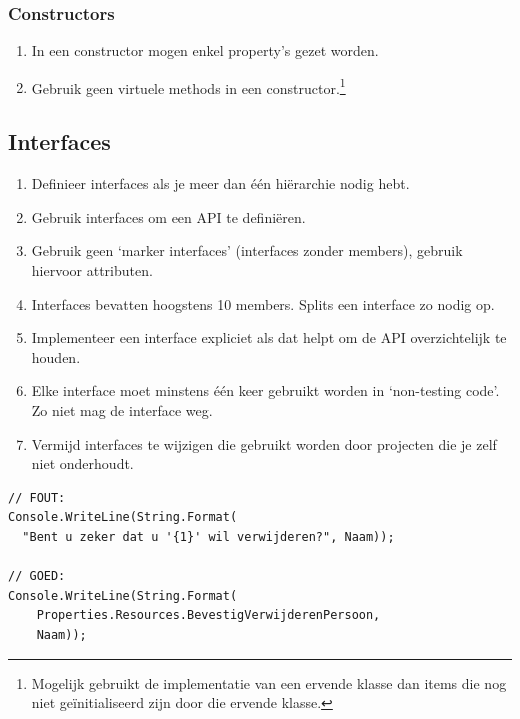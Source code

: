 \documentclass[a4paper,11pt]{article}
\begin{document}
\subsubsection{Constructors}
\begin{enumerate}[resume]
\item In een constructor mogen enkel property's gezet worden.
\item Gebruik geen virtuele methods in een constructor.\footnote{Mogelijk
gebruikt de implementatie van een ervende klasse dan items die nog niet
ge\"initialiseerd zijn door die ervende klasse.}
\end{enumerate}



\subsection{Interfaces}
\begin{enumerate}[resume]
\item Definieer interfaces als je meer dan \'e\'en hi\"erarchie nodig hebt.
\item Gebruik interfaces om een API te defini\"eren.
\item Gebruik geen `marker interfaces' (interfaces zonder members), gebruik
hiervoor attributen.
\item Interfaces bevatten hoogstens 10 members.  Splits een interface
zo nodig op.
\item Implementeer een interface expliciet als dat helpt om de API
overzichtelijk te houden.
\item Elke interface moet minstens \'e\'en keer gebruikt worden in
`non-testing code'.  Zo niet mag de interface weg.
\item Vermijd interfaces te wijzigen die gebruikt worden door projecten die je zelf niet onderhoudt.
\end{enumerate}


\begin{lstlisting}[float,caption=Geen letterlijke strings,label=lstStrLit]
// FOUT:
Console.WriteLine(String.Format(
  "Bent u zeker dat u '{1}' wil verwijderen?", Naam));

// GOED:
Console.WriteLine(String.Format(
	Properties.Resources.BevestigVerwijderenPersoon,
	Naam));
\end{lstlisting}
\end{document}
